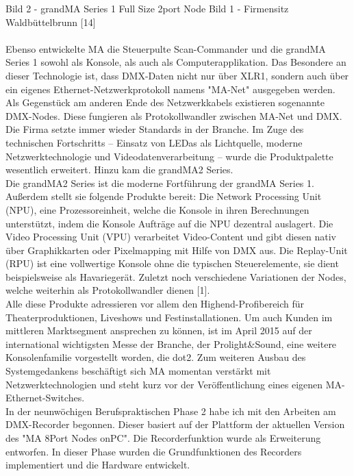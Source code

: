 \documentclass[11pt]{scrartcl}
\begin{document}
Bild 2 - grandMA Series 1 Full Size 2port Node
Bild 1 - Firmensitz Waldbüttelbrunn [14]\\
\\
Ebenso entwickelte MA die Steuerpulte Scan-Commander und die grandMA Series 1 sowohl als
Konsole, als auch als Computerapplikation. Das Besondere an dieser Technologie ist, dass DMX-Daten
nicht nur über XLR1, sondern auch über ein eigenes Ethernet-Netzwerkprotokoll namens "MA-Net"
ausgegeben werden. Als Gegenstück am anderen Ende des Netzwerkkabels existieren sogenannte
DMX-Nodes. Diese fungieren als Protokollwandler zwischen MA-Net und DMX.\\
Die Firma setzte immer wieder Standards in der Branche. Im Zuge des technischen Fortschritts –
Einsatz von LEDas als Lichtquelle, moderne Netzwerktechnologie und Videodatenverarbeitung –
wurde die Produktpalette wesentlich erweitert. Hinzu kam die grandMA2 Series.\\
Die grandMA2 Series ist die moderne Fortführung der grandMA Series 1. Außerdem stellt sie
folgende Produkte bereit: Die Network Processing Unit (NPU), eine Prozessoreinheit, welche die
Konsole in ihren Berechnungen unterstützt, indem die Konsole Aufträge auf die NPU dezentral
auslagert. Die Video Processing Unit (VPU) verarbeitet Video-Content und gibt diesen nativ über
Graphikkarten oder Pixelmapping mit Hilfe von DMX aus. Die Replay-Unit (RPU) ist eine vollwertige
Konsole ohne die typischen Steuerelemente, sie dient beispielsweise als Havariegerät. Zuletzt noch
verschiedene Variationen der Nodes, welche weiterhin als Protokollwandler dienen [1].\\
Alle diese Produkte adressieren vor allem den Highend-Profibereich für Theaterproduktionen,
Liveshows und Festinstallationen. Um auch Kunden im mittleren Marktsegment ansprechen zu
können, ist im April 2015 auf der international wichtigsten Messe der Branche, der Prolight\&Sound,
eine weitere Konsolenfamilie vorgestellt worden, die dot2. Zum weiteren Ausbau des
Systemgedankens beschäftigt sich MA momentan verstärkt mit Netzwerktechnologien und steht kurz
vor der Veröffentlichung eines eigenen MA-Ethernet-Switches.\\
In der neunwöchigen Berufspraktischen Phase 2 habe ich mit den Arbeiten am DMX-Recorder
begonnen. Dieser basiert auf der Plattform der aktuellen Version des "MA 8Port Nodes onPC". Die
Recorderfunktion wurde als Erweiterung entworfen. In dieser Phase wurden die Grundfunktionen
des Recorders implementiert und die Hardware entwickelt.\\
\end{document}

